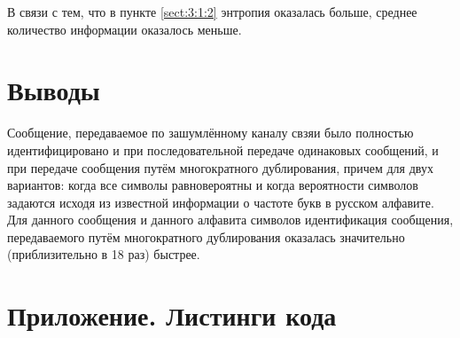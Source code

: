 В связи с тем, что в пункте \ref{sect:3:1:2} энтропия оказалась больше, среднее количество информации оказалось меньше.

\newpage

\section{Выводы}

Сообщение, передаваемое по зашумлённому каналу свзяи было полностью идентифицировано и при последовательной передаче одинаковых сообщений, и при передаче сообщения путём многократного дублирования, причем для двух вариантов: когда все символы равновероятны и когда вероятности символов задаются исходя из известной информации о частоте букв в русском алфавите. Для данного сообщения и данного алфавита символов идентификация сообщения, передаваемого путём многократного дублирования оказалась значительно (приблизительно в 18 раз) быстрее.

\newpage
\section{Приложение. Листинги кода}


\parindent=1cm

\newpage


\parindent=1cm

\newpage


\parindent=1cm


\parindent=1cm


\parindent=1cm


\parindent=1cm

\newpage


\parindent=1cm


\parindent=1cm

\newpage


\parindent=1cm


